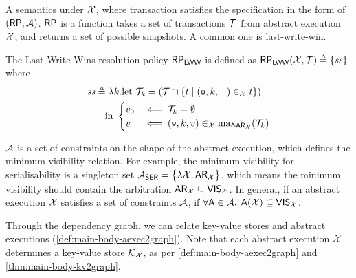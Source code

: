 
A semantics under \( \mathcal{X} \), where transaction satisfies the specification in the form of \( (\mathsf{RP},\mathcal{A}) \).
\( \mathsf{RP} \) is a function takes a set of transactions \( \mathcal{T} \) from abstract execution \( \mathcal{X} \), 
and returns  a set of possible snapshots.
A common one is last-write-win.

\begin{definition}
\label{def:lww}
The Last Write Wins resolution policy $\mathsf{RP}_{\mathsf{LWW}}$ is defined as 
$\mathsf{RP}_{\mathsf{LWW}}(\mathcal{X}, \mathcal{T}) \triangleq \{\mathit{ss}\}$ where
\begin{align*}
    \mathit{ss} & \triangleq \lambda k. \text{let} \ \mathcal{T}_{k} = ( \mathcal{T} \cap \{t \mid (\textnormal{\texttt w},k, \_) \in_{\mathcal{X}} t\}) \\
       & \quad \text{in} \
\begin{cases}
v_{0} &\impliedby \mathcal{T}_{k} =  \emptyset\\
v &\impliedby (\textnormal{\texttt w}, k, v) \in_{\mathcal{X}} \max_{\mathsf{AR}_{\mathcal{X}}}(\mathcal{T}_{k})
\end{cases}
\end{align*}
\end{definition}

\( \mathcal{A} \) is a set of constraints on the shape of the abstract execution,
which defines the minimum visibility relation.
For example, the minimum visibility for serialisability is a singleton set
\( \Ax_\SER = \Set{\lambda \aexec \ldotp \AR_\aexec } \),
which means the minimum visibility should contain the arbitration \( \mathsf{AR}_{\mathcal{X}} \subseteq \mathsf{VIS}_{\mathcal{X}} \).
In general, if an abstract execution \( \mathcal{X} \) satisfies a set of constraints  \( \mathcal{A} \),
if \( \forall \mathsf{A} \in \mathcal{A} \ldotp \; \mathsf{A}(\mathcal{X}) \subseteq \mathsf{VIS}_{\mathcal{X}} \).

Through the dependency graph, we can relate key-value stores and abstract executions (\cref{def:main-body-aexec2graph}).
Note that each abstract execution $\mathcal{X}$ determines a key-value store 
$\mathcal{K}_{\mathcal{X}}$, as per \cref{def:main-body-aexec2graph} and \cref{thm:main-body-kv2graph}. 

